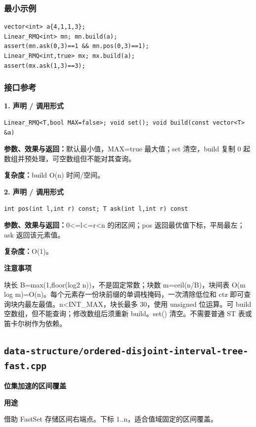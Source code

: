 \documentclass[UTF8,a4paper,10pt]{ctexart}
\newcommand{\TemplUsage}[1]{\textbf{用途}\par #1\par}
\newcommand{\TemplNote}[1]{\textbf{注意事项}\par #1\par}
\begin{document}
\subsubsection*{最小示例}
\begin{lstlisting}
vector<int> a{4,1,1,3};
Linear_RMQ<int> mn; mn.build(a);
assert(mn.ask(0,3)==1 && mn.pos(0,3)==1);
Linear_RMQ<int,true> mx; mx.build(a);
assert(mx.ask(1,3)==3);
\end{lstlisting}
\subsubsection*{接口参考}
\noindent\begin{minipage}{\textwidth}
\textbf{1. 声明 / 调用形式}
\begin{lstlisting}
Linear_RMQ<T,bool MAX=false>; void set(); void build(const vector<T> &a)
\end{lstlisting}
\textbf{参数、效果与返回：}默认最小值，MAX=true 最大值；set 清空，build 复制 0 起数组并预处理，可空数组但不能对其查询。

\textbf{复杂度：}build O(n) 时间/空间。

\end{minipage}\par\vspace{0.4em}
\noindent\begin{minipage}{\textwidth}
\textbf{2. 声明 / 调用形式}
\begin{lstlisting}
int pos(int l,int r) const; T ask(int l,int r) const
\end{lstlisting}
\textbf{参数、效果与返回：}0<=l<=r<n 的闭区间；pos 返回最优值下标，平局最左；ask 返回该元素值。

\textbf{复杂度：}O(1)。

\TemplNote{块长 B=max(1,floor(log2 n))，不是固定常数；块数 m=ceil(n/B)，块间表 O(m log m)=O(n)。每个元素存一份块前缀的单调栈掩码，一次清除低位和 ctz 即可查询块内最左最值。n<INT\_MAX，块长最多 30，使用 unsigned 位运算。可 build 空数组，但不能查询；修改数组后须重新 build。set() 清空。不需要普通 ST 表或笛卡尔树作为依赖。}
\end{minipage}\par\vspace{0.4em}
\clearpage
\subsection{\texttt{data-structure/ordered-disjoint-interval-tree-fast.cpp}}
\textbf{位集加速的区间覆盖}\par
\TemplUsage{借助 FastSet 存储区间右端点。下标 1..n，适合值域固定的区间覆盖。}
\end{document}
